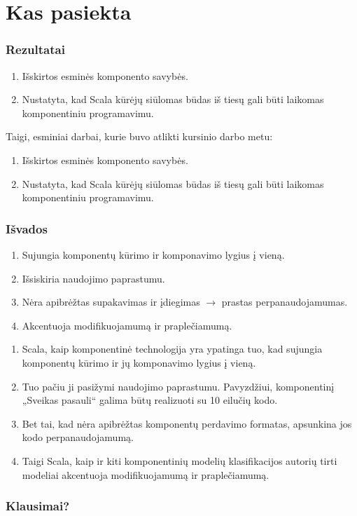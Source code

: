 \section{Kas pasiekta}

\begin{frame}
  \frametitle{Rezultatai}
  \begin{enumerate}
    \item Išskirtos esminės komponento savybės.
    \item Nustatyta, kad Scala kūrėjų siūlomas būdas iš tiesų gali
      būti laikomas komponentiniu programavimu.
  \end{enumerate}
  \begin{handout}
    Taigi, esminiai darbai, kurie buvo atlikti kursinio darbo metu:
    \begin{enumerate}
      \item Išskirtos esminės komponento savybės.
      \item Nustatyta, kad Scala kūrėjų siūlomas būdas iš tiesų gali
        būti laikomas komponentiniu programavimu.
    \end{enumerate}
  \end{handout}
\end{frame}

\begin{frame}
  \frametitle{Išvados}
  \begin{enumerate}
    \item Sujungia komponentų kūrimo ir komponavimo lygius į vieną.
    \item Išsiskiria naudojimo paprastumu.
    \item Nėra apibrėžtas supakavimas ir įdiegimas $\to$ prastas
      perpanaudojamumas.
    \item Akcentuoja modifikuojamumą ir praplečiamumą.
  \end{enumerate}
  \begin{handout}
    \begin{enumerate}
      \item Scala, kaip komponentinė technologija yra ypatinga tuo, kad
        sujungia komponentų kūrimo ir jų komponavimo lygius į vieną.
      \item Tuo pačiu ji pasižymi naudojimo paprastumu. Pavyzdžiui,
        komponentinį „Sveikas pasauli“ galima būtų realizuoti su
        10 eilučių kodo.
      \item Bet tai, kad nėra apibrėžtas komponentų perdavimo formatas,
        apsunkina jos kodo perpanaudojamumą.
      \item Taigi Scala, kaip ir kiti komponentinių modelių
        klasifikacijos autorių tirti modeliai akcentuoja
        modifikuojamumą ir praplečiamumą.
    \end{enumerate}
  \end{handout}
\end{frame}

\begin{frame}
  \frametitle{Klausimai?}
\end{frame}
